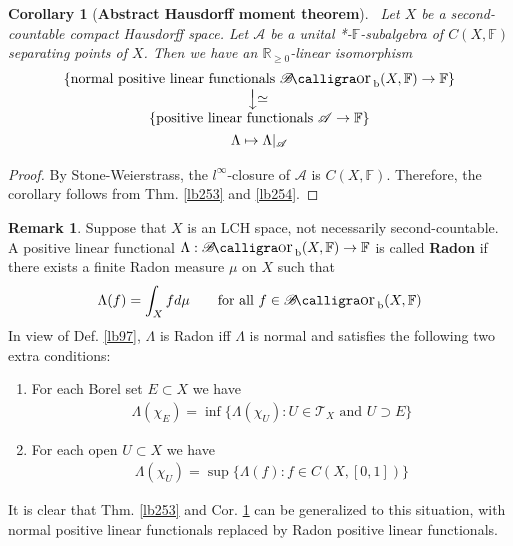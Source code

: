 \documentclass[12pt,b5paper,notitlepage]{article}
\theoremstyle{definition}
\newtheorem{rem}[df]{Remark}
\theoremstyle{plain}
\newtheorem{co}[df]{Corollary}
\DeclareMathOperator{\Borb}{{\mathscr{B}\text{\kern -2pt {\calligra\large or}}\,}_{\mathrm b}}
\newcommand{\scr}{\mathscr}
\newcommand{\Rbb}{\mathbb R}
\newcommand{\Fbb}{\mathbb F}
\newcommand{\MT}{\mathcal T}
\numberwithin{equation}{section}
\begin{document}
\begin{co}[\textbf{Abstract Hausdorff moment theorem}]\label{lb261}\
Let $X$ be a second-countable compact Hausdorff space. Let $\scr A$ be a unital *-$\Fbb$-subalgebra of $C(X,\Fbb)$ separating points of $X$. Then we have an $\Rbb_{\geq0}$-linear isomorphism
\begin{gather}
\begin{gathered}
\begin{array}{c}
\{\text{normal positive linear functionals $\Borb(X,\Fbb)\rightarrow\Fbb$}\}\\
\raisebox{0.3cm}{\rotatebox{-90}{$\xlongrightarrow{\rotatebox{90}{$\simeq$}}$}}\\
\{\text{positive linear functionals $\scr A\rightarrow\Fbb$}\}
\end{array}
\\
\Lambda\mapsto\Lambda|_{\scr A}
\end{gathered}
\end{gather}
\end{co}

\begin{proof}
By Stone-Weierstrass, the $l^\infty$-closure of $\scr A$ is $C(X,\Fbb)$. Therefore, the corollary follows from Thm. \ref{lb253} and \ref{lb254}.
\end{proof}



\begin{rem}\label{lb275}
Suppose that $X$ is an LCH space, not necessarily second-countable. A positive linear functional $\Lambda:\Borb(X,\Fbb)\rightarrow\Fbb$ is called \textbf{Radon}  if there exists a finite Radon measure $\mu$ on $X$ such that
\begin{align*}
\Lambda(f)=\int_X fd\mu\qquad\text{for all }f\in\Borb(X,\Fbb)
\end{align*}
In view of Def. \ref{lb97}, $\Lambda$ is Radon iff $\Lambda$ is normal and satisfies the following two extra conditions:
\begin{enumerate}[label=(\alph*)]
\item For each Borel set $E\subset X$ we have
\begin{align*}
\Lambda(\chi_E)=\inf\big\{\Lambda(\chi_U):U\in\MT_X\text{ and }U\supset E  \big\}
\end{align*} 
\item For each open $U\subset X$ we have
\begin{align*}
\Lambda(\chi_U)=\sup\big\{\Lambda(f):f\in C(X,[0,1])  \big\}
\end{align*}
\end{enumerate}
It is clear that Thm. \ref{lb253} and Cor. \ref{lb261} can be generalized to this situation, with normal positive linear functionals replaced by Radon positive linear functionals.
\end{rem}
\end{document}
